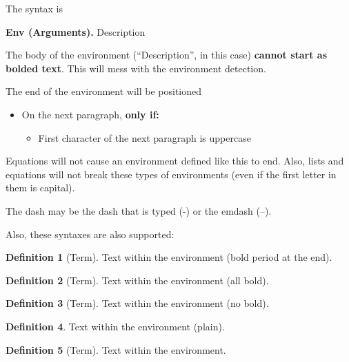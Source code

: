 \documentclass[12pt]{article}
\theoremstyle{plain}
\theoremstyle{remark}
\theoremstyle{definition}
\newtheorem{definition}{Definition}[section]
\begin{document}
The syntax is

\begin{framed}

\textbf{Env (Arguments).} Description

\end{framed}



The body of the environment (``Description'', in this case)
\textbf{cannot start as bolded text}. This will mess with the
environment detection.

The end of the environment will be positioned

\begin{itemize}
\item
  On the next paragraph, \textbf{only if:}

  \begin{itemize}
  \item
    First character of the next paragraph is uppercase
  \end{itemize}
\end{itemize}

Equations will not cause an environment defined like this to end. Also,
lists and equations will not break these types of environments (even if
the first letter in them is capital).

The dash may be the dash that is typed (-) or the emdash (--).

Also, these syntaxes are also supported:

\begin{framed}

\begin{definition}[Term]
Text within the environment (bold
period at the end).
\end{definition}

\begin{definition}[Term]
Text within the environment (all bold).
\end{definition}

\begin{definition}[Term]
Text within the environment (no bold).
\end{definition}

\begin{definition}
Text within the environment (plain).
\end{definition}

\begin{definition}[Term]
Text within the environment.
\end{definition}

\end{framed}
\end{document}
